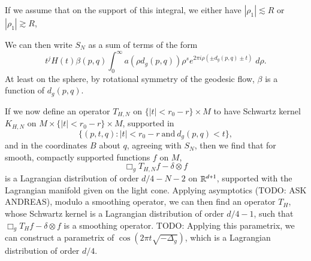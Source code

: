 If we assume that on the support of this integral, we either have $|\rho_1| \lesssim R$ or $|\rho_1| \gtrsim R$,

We can then write $S_N$ as a sum of terms of the form
%
\[ t^j H(t) \beta( p, q ) \int_0^\infty a( \rho d_g(p,q) ) \rho^s e^{2 \pi i \rho ( \pm d_g(p,q) \pm t )}\; d\rho. \]
%
At least on the sphere, by rotational symmetry of the geodesic flow, $\beta$ is a function of $d_g(p,q)$.




If we now define an operator $T_{H,N}$ on $\{ |t| < r_0 - r \} \times M$ to have Schwartz kernel $K_{H,N}$ on $M \times \{ |t| < r_0 - r \} \times M$, supported in
%
\[ \{ (p,t,q) : |t| < r_0 - r\ \text{and}\ d_g(p,q) < t \}, \]
%
and in the coordinates $B$ about $q$, agreeing with $S_N$, then we find that for smooth, compactly supported functions $f$ on $M$,
%
\[ \Box_g T_{H,N} f - \delta \otimes f \]
%
is a Lagrangian distribution of order $d/4 - N - 2$ on $\operatorname{\mathbb{R}}^{d+1}$, supported with the Lagrangian manifold given on the light cone. Applying asymptotics (TODO: ASK ANDREAS), modulo a smoothing operator, we can then find an operator $T_H$, whose Schwartz kernel is a Lagrangian distribution of order $d/4 - 1$, such that $\Box_g T_H f - \delta \otimes f$ is a smoothing operator. TODO: Applying this parametrix, we can construct a parametrix of $\cos(2 \pi t \sqrt{-\Delta_g})$, which is a Lagrangian distribution of order $d/4$.

